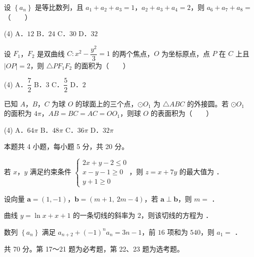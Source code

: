 设 $\left\{a_n\right\}$ 是等比数列，且 $a_1+a_2+a_3=1$，$a_2+a_3+a_4=2$，则 $a_6+a_7+a_8=$（　　）

\begin{gkopts}(4)
\task A．$12$
\task B．$24$
\task C．$30$
\task D．$32$
\end{gkopts}

设 $F_1$，$F_2$ 是双曲线 $C:x^{2}-\dfrac{y^{2}}3=1$ 的两个焦点，$O$ 为坐标原点，点 $P$ 在 $C$ 上且 $|OP|=2$，则 $\triangle PF_1F_2$ 的面积为（　　）

\begin{gkopts}(4)
\task A．$\dfrac72$
\task B．$3$
\task C．$\dfrac52$
\task D．$2$
\end{gkopts}

已知 $A$，$B$，$C$ 为球 $O$ 的球面上的三个点，$\odot O_1$ 为 $\triangle ABC$ 的外接圆。若 $\odot O_1$ 的面积为 $4\pi$，$AB=BC=AC=OO_1$，则球 $O$ 的表面积为（　　）

\begin{gkopts}(4)
\task A．$64\pi$
\task B．$48\pi$
\task C．$36\pi$
\task D．$32\pi$
\end{gkopts}

\par\medskip


\begin{gktip}
本题共 4 小题，每小题 5 分，共 20 分。
\end{gktip}

若 $x$，$y$ 满足约束条件 $\begin{cases}2x+y-2\le0\\ x-y-1\ge0\\ y+1\ge0\end{cases}$，则 $z=x+7y$ 的最大值为 \gkblank{}．

设向量 $\boldsymbol a=(1,-1)$，$\boldsymbol b=(m+1,\ 2m-4)$，若 $\boldsymbol a\perp\boldsymbol b$，则 $m=$ \gkblank{}．

曲线 $y=\ln x+x+1$ 的一条切线的斜率为 $2$，则该切线的方程为 \gkblank{}．

数列 $\left\{a_n\right\}$ 满足 $a_{n+2}+(-1)^{n}a_n=3n-1$，前 $16$ 项和为 $540$，则 $a_1=$ \gkblank{}．

\par\medskip


\begin{gktip}
共 70 分。第 17～21 题为必考题，第 22、23 题为选考题。
\end{gktip}

